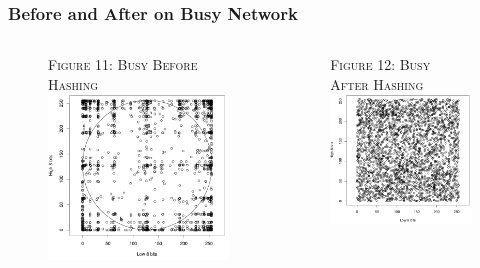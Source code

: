 \documentclass{beamer}
\begin{document}
\begin{frame}
\frametitle{Before and After on Busy Network}
\begin{columns}
\begin{column}{0.5\textwidth}
\begin{figure}
{\tiny \textsc{Figure 11: Busy Before Hashing}}\\
\includegraphics[scale = 0.32]{images/bbh.png}
\end{figure}
\end{column}
\begin{column}{0.5\textwidth}
\begin{figure}
{\tiny \textsc{Figure 12: Busy After Hashing}}\\
\includegraphics[scale = 0.39]{images/bah.png}
\end{figure}
\end{column}
\end{columns}
\end{frame}
\end{document}
